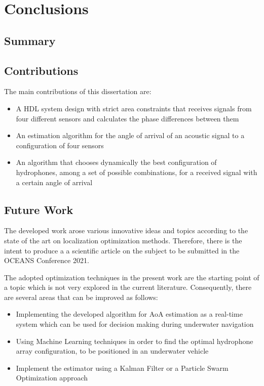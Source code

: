 \chapter{Conclusions}  \label{chap:conclusion}

\section{Summary}

\section{Contributions }

The main contributions of this dissertation are: 
\begin{itemize}
	\item A HDL system design with strict area constraints that receives signals from four different sensors and calculates the phase differences between them
	\item An estimation algorithm for the angle of arrival of an acoustic signal to a configuration of four sensors
	\item An algorithm that chooses dynamically the best configuration of hydrophones, among a set of possible combinations, for a received signal with a certain angle of arrival
\end{itemize}

\section{Future Work}

The developed work arose various innovative ideas and topics according to the state of the art on localization optimization methods. Therefore, there is the intent to produce a a scientific article on the subject to be submitted in the OCEANS Conference 2021.

The adopted optimization techniques in the present work are the starting point of a topic which is not very explored in the current literature. Consequently, there are several areas that can be improved as follows:

\begin{itemize}
	\item Implementing the developed algorithm for AoA estimation as a real-time system which can be used for decision making during underwater navigation
	\item Using Machine Learning techniques in order to find the optimal hydrophone array configuration, to be positioned in an underwater vehicle
	\item Implement the estimator using a Kalman Filter or a Particle Swarm Optimization approach
\end{itemize}